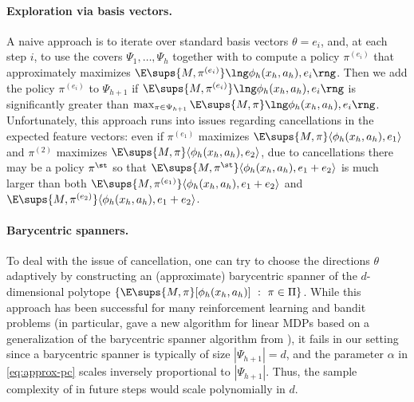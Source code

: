 \documentclass[11pt, oneside]{article}
\theoremstyle{plain}
\theoremstyle{definition}
\numberwithin{theorem}{section}
\renewcommand{\^}[1]{^{(#1)}}
\begin{document}
\paragraph{Exploration via basis vectors.} A naive approach is to iterate over standard basis vectors $\theta = e_i$, and, at each step $i$, to use the covers $\Psi_1, \ldots, \Psi_h$ together with \PSDP to compute a policy $\pi\^{e_i}$ that approximately maximizes $\E\sups{M, \pi\^{e_i}}\lng \phi_h(x_h, a_h), e_i \rng$. Then we add the policy $\pi\^{e_i}$  to $\Psi_{h+1}$ if $\E\sups{M, \pi\^{e_i}} \lng \phi_h(x_h, a_h), e_i \rng$ is significantly greater than $\max_{\pi \in \Psi_{h+1}} \E\sups{M, \pi} \lng \phi_h(x_h,a_h), e_i \rng$. Unfortunately, this approach runs into issues regarding cancellations in the expected feature vectors: even if $\pi^{(e_1)}$ maximizes $\E\sups{M,\pi}\langle \phi_{h}(x_{h},a_{h}),e_1\rangle$ and $\pi^{(2)}$ maximizes $\E\sups{M,\pi}\langle \phi_{h}(x_{h},a_{h}),e_2\rangle$, due to cancellations there may be a policy $\pi^\st$ so that $\E\sups{M,\pi^\st}\langle \phi_{h}(x_{h},a_{h}),e_1+e_2\rangle$ is much larger than both $\E\sups{M,\pi^{(e_1)}}\langle \phi_{h}(x_{h},a_{h}),e_1+e_2\rangle$ and $\E\sups{M,\pi^{(e_2)}}\langle \phi_{h}(x_{h},a_{h}),e_1+e_2\rangle$.

\paragraph{Barycentric spanners.} To deal with the issue of cancellation, one can try to choose the directions $\theta$ adaptively by constructing an (approximate) barycentric spanner \cite{awerbuch2008online} of the $d$-dimensional polytope $\{ \E\sups{M, \pi}[\phi_h(x_h , a_h)] \ : \ \pi \in \Pi \}$. While this approach has been successful for many reinforcement learning and bandit problems \cite{awerbuch2008online,dani2007price, kakade2007playing, lattimore2017end, foster2021statistical, golowich2022learning,mhammedi2023efficient} (in particular, \cite{mhammedi2023efficient} gave a new algorithm for linear MDPs based on a generalization of the barycentric spanner algorithm from \cite{awerbuch2008online}), it fails in our setting since a barycentric spanner is typically of size $|\Psi_{h+1}| = d$, and the parameter $\alpha$ in \cref{eq:approx-pc} scales inversely proportional to $|\Psi_{h+1}|$. Thus, the sample complexity of \PSDP in future steps would scale polynomially in $d$.
\end{document}
